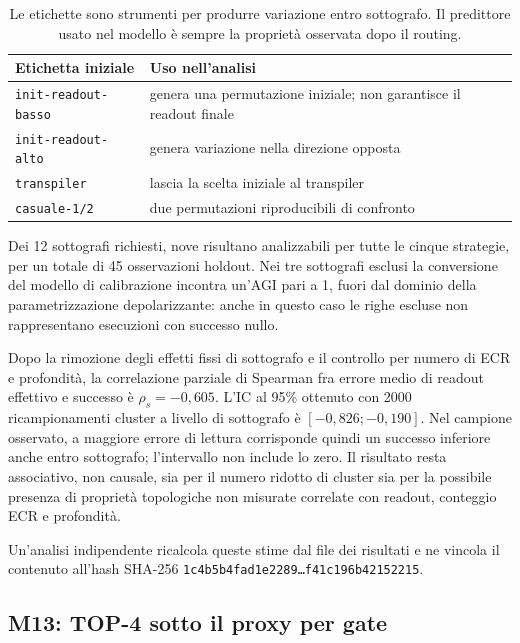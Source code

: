 \begin{onehalfspace}
\begin{table}[H]
\centering
\small
\begin{tabular}{l>{\raggedright\arraybackslash}p{}}
\toprule
\textbf{Etichetta iniziale} & \textbf{Uso nell'analisi} \\
\midrule
\texttt{init-readout-basso} & genera una permutazione iniziale; non garantisce il readout finale \\
\addlinespace[0.3em]
\texttt{init-readout-alto} & genera variazione nella direzione opposta \\
\addlinespace[0.3em]
\texttt{transpiler} & lascia la scelta iniziale al transpiler \\
\addlinespace[0.3em]
\texttt{casuale-1/2} & due permutazioni riproducibili di confronto \\
\bottomrule
\end{tabular}
\caption[Strategie descrittive di M11b]{Le etichette sono strumenti per produrre variazione entro sottografo. Il predittore usato nel modello \`e sempre la propriet\`a osservata dopo il routing.}\label{tab:app_comp_strategie}

\end{table}

Dei 12 sottografi richiesti, nove risultano analizzabili per tutte le cinque
strategie, per un totale di 45 osservazioni holdout. Nei tre sottografi esclusi
la conversione del modello di calibrazione incontra un'AGI pari a 1, fuori dal
dominio della parametrizzazione depolarizzante: anche in questo caso le righe
escluse non rappresentano esecuzioni con successo nullo.

Dopo la rimozione degli effetti fissi di sottografo e il controllo per numero di
ECR e profondit\`a, la correlazione parziale di Spearman fra errore medio di
readout effettivo e successo \`e $\rho_s=-0,605$. L'IC al 95\% ottenuto con 2000
ricampionamenti cluster a livello di sottografo \`e $[-0,826;-0,190]$. Nel
campione osservato, a maggiore errore di lettura corrisponde quindi un successo
inferiore anche entro sottografo; l'intervallo non include lo zero. Il risultato
resta associativo, non causale, sia per il numero ridotto di cluster sia per la
possibile presenza di propriet\`a topologiche non misurate correlate con readout,
conteggio ECR e profondit\`a.

Un'analisi indipendente ricalcola queste stime dal file dei risultati e ne
vincola il contenuto all'hash SHA-256 \texttt{1c4b5b4fad1e2289\ldots f41c196b42152215}.

\subsection{M13: TOP-4 sotto il proxy per gate}
\label{sec:app_comp_topk}


\end{onehalfspace}
